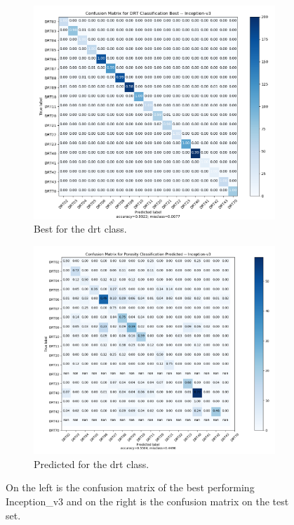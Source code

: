 \begin{figure}
{\begin{subfigure}[b]{.6\textwidth}
\centering
\includegraphics[width=.95\textwidth]{figures/04-go_drt_best.PNG}
\caption{Best for the \gls{drt} class.}
\label{fig:gocm_drt}
\end{subfigure}%
\begin{subfigure}[b]{.6\textwidth}
\centering
\includegraphics[width=.95\textwidth]{figures/04-go_drt_pred.PNG}
\caption{Predicted for the \gls{drt} class.}
\label{fig:gocm_drt_pred}
\end{subfigure}%
}
\caption[Confusion matrices of classes trained on Inception\_v3]{On the left is the confusion matrix of the best performing Inception\_v3 and on the right is the confusion matrix on the test set.}
\label{fig:gocm}
\end{figure}

